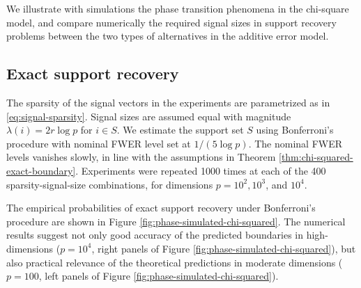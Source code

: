 We illustrate with simulations the phase transition phenomena in the chi-square model, and compare numerically the required signal sizes in support recovery problems between the two types of alternatives in the additive error model.

\subsection{Exact support recovery}

The sparsity of the signal vectors in the experiments are parametrized as in \eqref{eq:signal-sparsity}. 
Signal sizes are assumed equal with magnitude $\lambda(i)=2r\log{p}$ for $i\in S$.
We estimate the support set $S$ using Bonferroni's procedure with nominal FWER level set at $1/(5{\log{p}})$.
The nominal FWER levels vanishes slowly, in line with the assumptions in Theorem \ref{thm:chi-squared-exact-boundary}.
Experiments were repeated 1000 times at each of the 400 sparsity-signal-size combinations, for dimensions $p=10^2, 10^3$, and $10^4$.

The empirical probabilities of exact support recovery under Bonferroni's procedure are shown in Figure \ref{fig:phase-simulated-chi-squared}.
The numerical results suggest not only good accuracy of the predicted boundaries in high-dimensions ($p=10^4$, right panels of Figure \ref{fig:phase-simulated-chi-squared}), but also practical relevance of the theoretical predictions in moderate dimensions ($p=100$, left panels of Figure \ref{fig:phase-simulated-chi-squared}).

